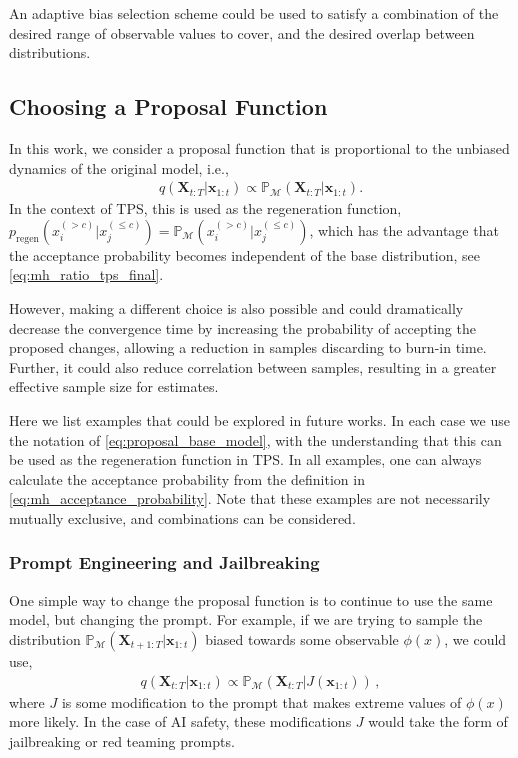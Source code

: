 \documentclass{article}
\newcommand{\realtraj}{\mathbf{x}}
\newcommand{\unrealtraj}{\mathbf{X}}
\newcommand{\Prob}{\mathbb{P}}
\newcommand{\probmodel}{\Prob_{\mathcal{M}}}
\begin{document}
An adaptive bias selection scheme could be used to satisfy a combination of the desired range of observable values to cover, and the desired overlap between distributions.

\subsection{Choosing a Proposal Function}
In this work, we consider a proposal function that is proportional to the unbiased dynamics of the original model, i.e.,
\begin{align}
    q(\unrealtraj_{t:T} | \realtraj_{1:t}) \propto \probmodel( \unrealtraj_{t:T} | \realtraj_{1:t}) .
    \label{eq:proposal_base_model}
\end{align}
In the context of TPS, this is used as the regeneration function, $p_{\text{regen}}(x_{i}^{(> c)} | x_{j}^{(\le c)}) = \probmodel( x_{i}^{(> c)} | x_{j}^{(\le c)})$, which has the
advantage that the acceptance probability becomes independent of the base distribution, see \eqref{eq:mh_ratio_tps_final}.

However, making a different choice is also possible and could dramatically decrease the convergence time by increasing the probability of accepting the proposed changes, allowing a reduction in samples discarding to burn-in time. Further, it could also reduce correlation between samples, resulting in a greater effective sample size for estimates.

Here we list examples that could be explored in future works. In each case we use the notation of \eqref{eq:proposal_base_model}, with the understanding that this can be used as the
regeneration function in TPS. In all examples, one can always
calculate the acceptance probability from the definition in \eqref{eq:mh_acceptance_probability}.
Note that these examples are not necessarily mutually exclusive, and combinations can be considered.

\subsubsection{Prompt Engineering and Jailbreaking}
One simple way to change the proposal function is to continue to use the same model, but changing the prompt.
For example, if we are trying to sample the distribution $\probmodel( \unrealtraj_{t+1:T} | \realtraj_{1:t})$ biased towards some observable $\phi(x)$, we could use,
\begin{align}
    q(\unrealtraj_{t:T} | \realtraj_{1:t}) \propto \probmodel(\unrealtraj_{t:T} | J(\realtraj_{1:t})) \,,
\end{align}
where $J$ is some modification to the prompt that makes extreme values of $\phi(x)$ more likely.
In the case of AI safety, these modifications $J$ would take the form of jailbreaking or red teaming prompts.
\end{document}
